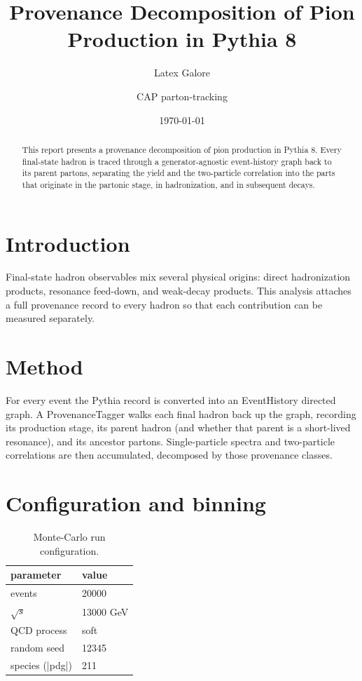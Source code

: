 \documentclass{article}
\title{Provenance Decomposition of Pion Production in Pythia 8}
\subtitle{Latex Galore}
\author{CAP parton-tracking}
\institute{Wayne State University}
\date{\today}
\begin{document}
\maketitle
\begin{abstract}
This report presents a provenance decomposition of pion production in Pythia 8.  Every final-state hadron is traced through a generator-agnostic event-history graph back to its parent partons, separating the yield and the two-particle correlation into the parts that originate in the partonic stage, in hadronization, and in subsequent decays.
\end{abstract}




\section{Introduction}


Final-state hadron observables mix several physical origins: direct hadronization products, resonance feed-down, and weak-decay products.  This analysis attaches a full provenance record to every hadron so that each contribution can be measured separately.




\section{Method}


For every event the Pythia record is converted into an EventHistory directed graph.  A ProvenanceTagger walks each final hadron back up the graph, recording its production stage, its parent hadron (and whether that parent is a short-lived resonance), and its ancestor partons.  Single-particle spectra and two-particle correlations are then accumulated, decomposed by those provenance classes.




\section{Configuration and binning}


\begin{table}[htbp]
\centering
\begin{tabular}{l l}
\hline
parameter & value \\
\hline\hline
events & 20000 \\
$\sqrt{s}$ & 13000 GeV \\
QCD process & soft \\
random seed & 12345 \\
species (|pdg|) & 211 \\
\hline
\end{tabular}
\caption{Monte-Carlo run configuration.}
\label{tab:config}
\end{table}
\end{document}

